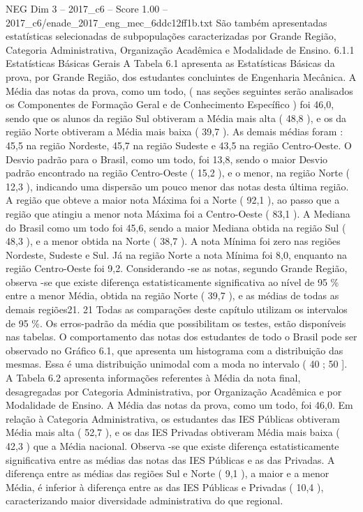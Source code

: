 \begin{textsample}{NEG Dim 3 – 2017\_c6 – Score 1.00 – 2017\_c6/enade\_2017\_eng\_mec\_6ddc12ff1b.txt}
São também apresentadas estatísticas selecionadas de subpopulações caracterizadas por Grande Região, Categoria Administrativa, Organização Acadêmica e Modalidade de Ensino. 6.1.1 Estatísticas Básicas Gerais A Tabela 6.1 apresenta as Estatísticas Básicas da prova, por Grande Região, dos estudantes concluintes de Engenharia Mecânica.
A Média das notas da prova, como um todo, ( nas seções seguintes serão analisados os Componentes de Formação Geral e de Conhecimento Específico ) foi 46,0, sendo que os alunos da região Sul obtiveram a Média mais alta ( 48,8 ), e os da região Norte obtiveram a Média mais baixa ( 39,7 ).
As demais médias foram : 45,5 na região Nordeste, 45,7 na região Sudeste e 43,5 na região Centro-Oeste.
O Desvio padrão para o Brasil, como um todo, foi 13,8, sendo o maior Desvio padrão encontrado na região Centro-Oeste ( 15,2 ), e o menor, na região Norte ( 12,3 ), indicando uma dispersão um pouco menor das notas desta última região.
A região que obteve a maior nota Máxima foi a Norte ( 92,1 ), ao passo que a região que atingiu a menor nota Máxima foi a Centro-Oeste ( 83,1 ).
A Mediana do Brasil como um todo foi 45,6, sendo a maior Mediana obtida na região Sul ( 48,3 ), e a menor obtida na Norte ( 38,7 ).
A nota Mínima foi zero nas regiões Nordeste, Sudeste e Sul.
Já na região Norte a nota Mínima foi 8,0, enquanto na região Centro-Oeste foi 9,2.
Considerando -se as notas, segundo Grande Região, observa -se que existe diferença estatisticamente significativa ao nível de 95 \% entre a menor Média, obtida na região Norte ( 39,7 ), e as médias de todas as demais regiões21. 21 Todas as comparações deste capítulo utilizam os intervalos de 95 \%.
Os erros-padrão da média que possibilitam os testes, estão disponíveis nas tabelas.
O comportamento das notas dos estudantes de todo o Brasil pode ser observado no Gráfico 6.1, que apresenta um histograma com a distribuição das mesmas.
Essa é uma distribuição unimodal com a moda no intervalo ( 40 ; 50 ].
A Tabela 6.2 apresenta informações referentes à Média da nota final, desagregadas por Categoria Administrativa, por Organização Acadêmica e por Modalidade de Ensino.
A Média das notas da prova, como um todo, foi 46,0.
Em relação à Categoria Administrativa, os estudantes das IES Públicas obtiveram Média mais alta ( 52,7 ), e os das IES Privadas obtiveram Média mais baixa ( 42,3 ) que a Média nacional.
Observa -se que existe diferença estatisticamente significativa entre as médias das notas das IES Públicas e as das Privadas.
A diferença entre as médias das regiões Sul e Norte ( 9,1 ), a maior e a menor Média, é inferior à diferença entre as das IES Públicas e Privadas ( 10,4 ), caracterizando maior diversidade administrativa do que regional.

\end{textsample}
